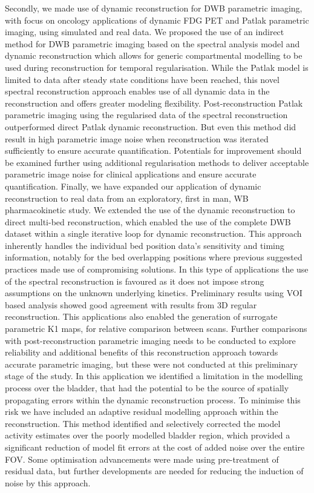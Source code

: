 Secondly, we made use of dynamic reconstruction for DWB parametric imaging, with focus on oncology applications of dynamic FDG PET and Patlak parametric imaging, using simulated and real data.
We proposed the use of an indirect method for DWB parametric imaging based on the spectral analysis model and dynamic reconstruction which allows for generic compartmental modelling to be used during reconstruction for temporal regularisation. While the Patlak model is limited to data after steady state conditions have been reached, this novel spectral reconstruction approach enables use of all dynamic data in the reconstruction and offers greater modeling flexibility. Post-reconstruction Patlak parametric imaging using the regularised data of the spectral reconstruction outperformed direct Patlak dynamic reconstruction. But even this method did result in high parametric image noise when reconstruction was iterated sufficiently to ensure accurate quantification. Potentials for improvement should be examined further using additional regularisation methods to deliver acceptable parametric image noise for clinical applications and ensure accurate quantification.
Finally, we have expanded our application of dynamic reconstruction to real data from an exploratory, first in man, WB pharmacokinetic study. We extended the use of the dynamic reconstruction to direct multi-bed reconstruction, which enabled the use of the complete DWB dataset within a single iterative loop for dynamic reconstruction. This approach inherently handles the individual bed position data's sensitivity and timing information, notably for the bed overlapping positions where previous suggested practices made use of compromising solutions. In this type of applications the use of the spectral reconstruction is favoured as it does not impose strong assumptions on the unknown underlying kinetics. Preliminary results using VOI based analysis showed good agreement with results from 3D regular reconstruction. This applications also enabled the generation of surrogate parametric K1 maps, for relative comparison between scans.
Further comparisons with post-reconstruction parametric imaging needs to be conducted to explore reliability and additional benefits of this reconstruction approach towards accurate parametric imaging, but these were not conducted at this preliminary stage of the study.
In this application we identified a limitation in the modelling process over the bladder, that had the potential to be the source of spatially propagating errors within the dynamic reconstruction process. 
To minimise this risk we have included an adaptive residual modelling approach within the reconstruction. This method identified and selectively corrected the model activity estimates over the poorly modelled bladder region, which provided a significant reduction of model fit errors at the cost of added noise over the entire FOV. Some optimisation advancements were made using pre-treatment of residual data, but further developments are needed for reducing the induction of noise by this approach. 

